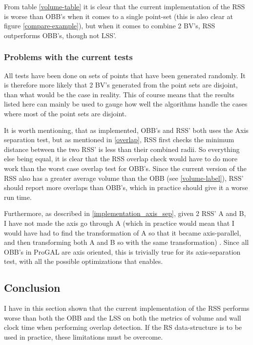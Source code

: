 From table \ref{volume-table} it is clear that the current implementation of the RSS is worse than OBB's when it comes to a single point-set (this is also clear at figure \ref{compare-example}), but when it comes to combine 2 BV's, RSS outperforms OBB's, though not LSS'. 

\subsubsection{Problems with the current tests}
\label{test_problems}
All tests have been done on sets of points that have been generated randomly. It is therefore more likely that 2 BV's generated from the point sets are disjoint, than what would be the case in reality. This of course means that the results listed here can mainly be used to gauge how well the algorithms handle the cases where most of the point sets are disjoint.

It is worth mentioning, that as implemented, OBB's and RSS' both uses the Axis separation test, but as mentioned in \ref{overlap}, RSS first checks the minimum distance between the two RSS' is less than their combined radii. So everything else being equal, it is clear that the RSS overlap check would have to do more work than the worst case overlap test for OBB's. Since the current version of the RSS also has a greater average volume than the OBB (see \ref{volume-label}), RSS' should report more overlaps than OBB's, which in practice should give it a worse run time.
 
Furthermore, as described in \ref{implementation_axis_sep}, given 2 RSS' A and B, I have not made the axis go through A (which in practice would mean that I would have had to find the transformation of A so that it became axis-parallel, and then transforming both A and B so with the same transformation) . Since all OBB's in ProGAL are axis oriented, this is trivially true for its axis-separation test, with all the possible optimizations that enables.

\subsection{Conclusion}
I have in this section shown that the current implementation of the RSS performs worse than both the OBB and the LSS on both the metrics of volume and wall clock time when performing overlap detection. If the RS data-structure is to be used in practice, these limitations must be overcome.
